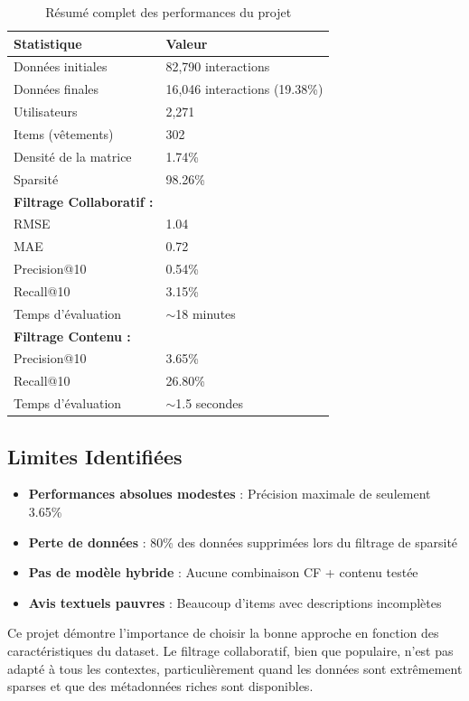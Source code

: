 \documentclass[12pt,a4paper]{article}
\begin{document}
\begin{table}[H]
\centering
\begin{tabular}{ll}
\toprule
\textbf{Statistique} & \textbf{Valeur} \\
\midrule
Données initiales & 82,790 interactions \\
Données finales & 16,046 interactions (19.38\%) \\
Utilisateurs & 2,271 \\
Items (vêtements) & 302 \\
Densité de la matrice & 1.74\% \\
Sparsité & 98.26\% \\
\midrule
\textbf{Filtrage Collaboratif :} & \\
\quad RMSE & 1.04 \\
\quad MAE & 0.72 \\
\quad Precision@10 & 0.54\% \\
\quad Recall@10 & 3.15\% \\
\quad Temps d'évaluation & $\sim$18 minutes \\
\midrule
\textbf{Filtrage Contenu :} & \\
\quad Precision@10 & 3.65\% \\
\quad Recall@10 & 26.80\% \\
\quad Temps d'évaluation & $\sim$1.5 secondes \\
\bottomrule
\end{tabular}
\caption{Résumé complet des performances du projet}
\end{table}

\subsection{Limites Identifiées}

\begin{itemize}
    \item \textbf{Performances absolues modestes} : Précision maximale de seulement 3.65\%
    \item \textbf{Perte de données} : 80\% des données supprimées lors du filtrage de sparsité
    \item \textbf{Pas de modèle hybride} : Aucune combinaison CF + contenu testée
    \item \textbf{Avis textuels pauvres} : Beaucoup d'items avec descriptions incomplètes
\end{itemize}

Ce projet démontre l'importance de choisir la bonne approche en fonction des caractéristiques du dataset. Le filtrage collaboratif, bien que populaire, n'est pas adapté à tous les contextes, particulièrement quand les données sont extrêmement sparses et que des métadonnées riches sont disponibles.
\end{document}
